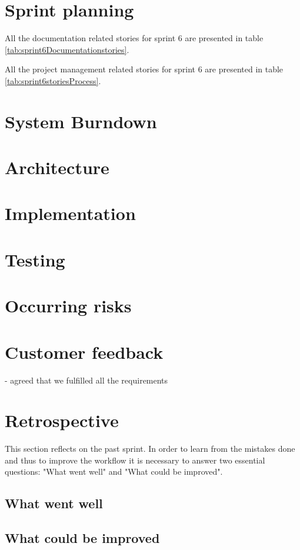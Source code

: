 \section{Sprint planning}

All the documentation related stories for sprint 6 are presented in table \ref{tab:sprint6Documentationstories}.


All the project management related stories for sprint 6 are presented in table \ref{tab:sprint6storiesProcess}.

\section{System Burndown}
\section{Architecture}
\section{Implementation}
\section{Testing}
\section{Occurring risks}
\section{Customer feedback}
- agreed that we fulfilled all the requirements

\section{Retrospective}
This section reflects on the past sprint. In order to learn from the mistakes done and thus to improve the workflow it is necessary to answer two essential questions: "What went well" and "What could be improved".

\subsection{What went well}
\subsection{What could be improved}
